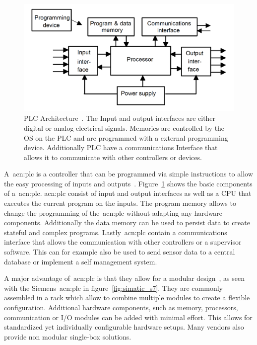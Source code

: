 \begin{figure}
    \includegraphics[width=\textwidth]{Figures/PLC_Architecture.png}
    \caption[PLC Architecture]{
       PLC Architecture~\cite[p.~4]{BOLTON200653}.
    The Input and output interfaces are either digital or analog electrical signals.
    Memories are controlled by the OS on the PLC and are programmed with a external programming device.
    Additionally PLC have a communications Interface that allows it to communicate with other controllers or devices.}
    \label{fig:plc_architecture}
\end{figure}

A~\acrfull{acn:plc} is a controller that can be programmed via simple instructions to allow the easy processing of inputs and outputs~\cite[p.~4]{BOLTON200653}.
Figure~\ref{fig:plc_architecture} shows the basic components of a~\acrshort{acn:plc}.
\acrshort{acn:plc} consist of input and output interfaces as well as a CPU that executes the current program on the inputs.
The program memory allows to change the programming of  the~\acrshort{acn:plc} without adapting any hardware components.
Additionally the data memory can be used to persist data to create stateful and complex programs.
Lastly~\acrshort{acn:plc} contain a communications interface that allows the communication with other controllers or a supervisor software.
This can for example also be used to send sensor data to a central database or implement a self management system.

A major advantage of~\acrshort{acn:plc} is that they allow for a modular design~\cite[p.~12]{BOLTON200653}, as seen with the Siemens~\acrshort{acn:plc} in figure~\ref{fig:simatic_s7}.
They are commonly assembled in a rack which allow to combine multiple modules to create a flexible configuration.
Additional hardware components, such as memory, processors, communication or I/O modules can be added with minimal effort.
This allows for standardized yet individually configurable hardware setups.
Many vendors also provide non modular single-box solutions.

